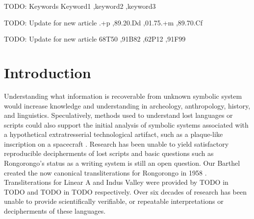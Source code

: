 \documentclass[preprint,12pt]{elsarticle}
\begin{document}
\begin{frontmatter}
\begin{keyword}
TODO: Keywords
Keyword1 \sep keyword2 \sep keyword3 

TODO: Update for new article
.+p \sep 89.20.Dd \sep 01.75.+m \sep 89.70.Cf

TODO: Update for new article
\MSC 68T50 \sep 91B82 \sep 62P12 \sep 91F99
\end{keyword}

\end{frontmatter}



\section{Introduction}

Understanding what information is recoverable from unknown symbolic system would increase knowledge and understanding in archeology, anthropology, history, and linguistics. Speculatively, methods used to understand lost languages or scripts could also support the initial analysis of symbolic systems associated with a hypothetical extratresserial technological artifact, such as a plaque-like inscription on a spacecraft \cite{}. Research has been unable to yield satisfactory reproducible decipherments of lost scripts and basic questions such as Rongorongo's status as a writing system is still an open question\cite{tamburini2025_automatic_decipherment}. Our Barthel created the now canonical transliterations for Rongorongo in 1958 \cite{barthel1958grundlagen}. Transliterations for Linear A and Indus Valley were provided by TODO in TODO \cite{salgarella2021_sigla} and TODO in TODO \cite{yadav2010_indus_ngrams} respectively. Over six decades of research has been unable to provide scientifically verifiable, or repeatable interpretations or decipherments of these languages. 
\end{document}
